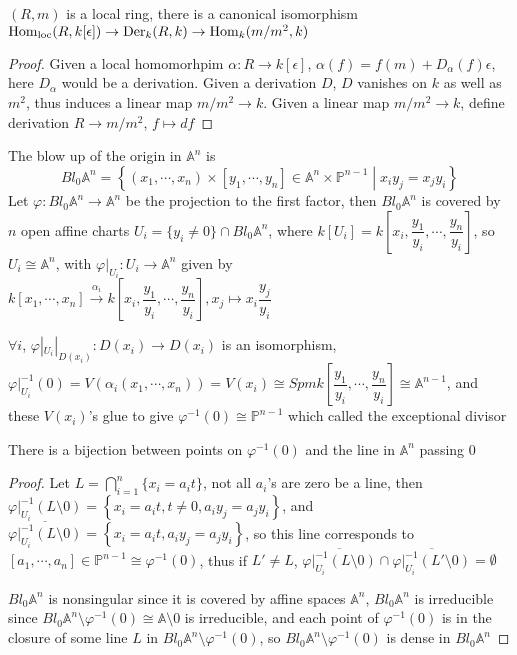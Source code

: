 \documentclass[main]{subfiles}
\begin{document}
\begin{proposition}
$(R,m)$ is a local ring, there is a canonical isomorphism $\operatorname{Hom}_{\text{loc}}(R,k[\epsilon])\to\operatorname{Der}_k(R,k)\to\operatorname{Hom}_k(m/m^2,k)$
\end{proposition}

\begin{proof}
Given a local homomorhpim $\alpha:R\to k[\epsilon]$, $\alpha(f)=f(m)+D_\alpha(f)\epsilon$, here $D_\alpha$ would be a derivation. Given a derivation $D$, $D$ vanishes on $k$ as well as $m^2$, thus induces a linear map $m/m^2\to k$. Given a linear map $m/m^2\to k$, define derivation $R\to m/m^2$, $f\mapsto df$
\end{proof}

\begin{definition}
The blow up of the origin in $\mathbb A^n$ is $$Bl_0\mathbb A^n=\left\{(x_1,\cdots,x_n)\times[y_1,\cdots,y_n]\in\mathbb A^n\times\mathbb P^{n-1}\middle|x_iy_j=x_jy_i\right\}$$Let $\varphi:Bl_0\mathbb A^n\to\mathbb A^n$ be the projection to the first factor, then $Bl_0\mathbb A^n$ is covered by $n$ open affine charts $U_i=\{y_i\neq0\}\cap Bl_0\mathbb A^n$, where $k[U_i]=k\left[x_i,\dfrac{y_1}{y_i},\cdots,\dfrac{y_n}{y_i}\right]$, so $U_i\cong\mathbb A^n$, with $\varphi|_{U_i}:U_i\to\mathbb A^n$ given by \\
$k[x_1,\cdots,x_n]\xrightarrow{\alpha_i}k\left[x_i,\dfrac{y_1}{y_i},\cdots,\dfrac{y_n}{y_i}\right], x_j\mapsto x_i\dfrac{y_j}{y_i}$ \par
$\forall i$, $\varphi|_{U_i}|_{D(x_i)} : D(x_i)\to D(x_i)$ is an isomorphism, $\varphi|_{U_i}^{-1}(0)=V(\alpha_i(x_1,\cdots,x_n))=V(x_i)\cong Spmk\left[\dfrac{y_1}{y_i},\cdots,\dfrac{y_n}{y_i}\right]\cong\mathbb A^{n-1}$, and these $V(x_i)$'s glue to give $\varphi^{-1}(0)\cong\mathbb P^{n-1}$ which called the exceptional divisor
\end{definition}

\begin{proposition}
There is a bijection between points on $\varphi^{-1}(0)$ and the line in $\mathbb A^n$ passing $0$
\end{proposition}

\begin{proof}
Let $L=\displaystyle\bigcap_{i=1}^n\{x_i=a_it\}$, not all $a_i$'s are zero be a line, then $\varphi|_{U_i}^{-1}(L\setminus 0)=\left\{x_i=a_it,t\neq0,a_iy_j=a_jy_i\right\}$, and $\overline{\varphi|_{U_i}^{-1}(L\setminus 0)}=\left\{x_i=a_it,a_iy_j=a_jy_i\right\}$, so this line corresponds to $[a_1,\cdots,a_n]\in\mathbb P^{n-1}\cong\varphi^{-1}(0)$, thus if $L'\neq L$, $\overline{\varphi|_{U_i}^{-1}(L\setminus 0)}\cap\overline{\varphi|_{U_i}^{-1}(L'\setminus 0)}=\emptyset$ \par
$Bl_0\mathbb A^n$ is nonsingular since it is covered by affine spaces $\mathbb A^n$, $Bl_0\mathbb A^n$ is irreducible since $Bl_0\mathbb A^n\setminus\varphi^{-1}(0)\cong\mathbb A\setminus0$ is irreducible, and each point of $\varphi^{-1}(0)$ is in the closure of some line $L$ in $Bl_0\mathbb A^n\setminus\varphi^{-1}(0)$, so $Bl_0\mathbb A^n\setminus\varphi^{-1}(0)$ is dense in $Bl_0\mathbb A^n$
\end{proof}
\end{document}

